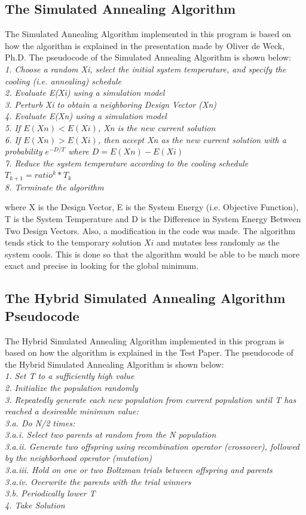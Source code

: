 \documentclass{article}
\begin{document}
\subsection{The Simulated Annealing Algorithm}
The Simulated Annealing Algorithm implemented in this program is based on how the algorithm is explained in the presentation made by Oliver de Weck, Ph.D. The pseudocode of the Simulated Annealing Algorithm is shown below:\\
\textit{
1. Choose a random Xi, select the initial system temperature, and specify the cooling (i.e. annealing) schedule\\
2. Evaluate E(Xi) using a simulation model\\
3. Perturb Xi to obtain a neighboring Design Vector (Xn)\\
4. Evaluate E(Xn) using a simulation model\\
5. If $E(Xn)< E(Xi)$, Xn is the new current solution\\
6. If $E(Xn)> E(Xi)$, then accept Xn as the new current solution with a probability $e^{-D/T}$ where $D = E(Xn) -E(Xi)$\\
7. Reduce the system temperature according to the cooling schedule $T_{k+1} = ratio^k*T_k$\\
8. Terminate the algorithm
}

where X is the Design Vector, E is the System Energy (i.e. Objective Function), T is the System Temperature and D is the Difference in System Energy Between Two Design Vectors. Also, a modification in the code was made. The algorithm tends stick to the temporary solution $Xi$ and mutates less randomly as the system cools. This is done so that the algorithm would be able to be much more exact and precise in looking for the global minimum.

\subsection{The Hybrid Simulated Annealing Algorithm Pseudocode}
The Hybrid Simulated Annealing Algorithm implemented in this program is based on how the algorithm is explained in the Test Paper. The pseudocode of the Hybrid Simulated Annealing Algorithm is shown below:\\
\textit{
1. Set T to a sufficiently high value\\
2. Initialize the population randomly\\
3. Repeatedly generate each new population from current population until T has reached a desireable minimum value:\\
	3.a. Do N/2 times:\\
		3.a.i. Select two parents at random from the N population\\
		3.a.ii. Generate two offspring using recombination operator (crossover), followed by the neighborhood operator (mutation)\\
		3.a.iii. Hold on one or two Boltzman trials between offspring and parents\\
		3.a.iv. Overwrite the parents with the trial winners\\
	3.b. Periodically lower T\\
4. Take Solution\\
}
\end{document}

